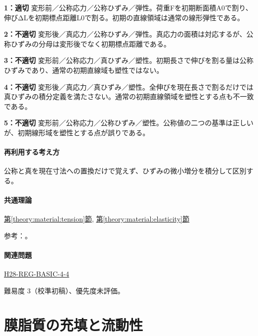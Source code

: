 \noindent\textbf{1：適切} 変形前／公称応力／公称ひずみ／弾性。荷重Fを初期断面積A0で割り、伸びΔLを初期標点距離L0で割る。初期の直線領域は通常の線形弾性である。\par

\noindent\textbf{2：不適切} 変形後／真応力／公称ひずみ／弾性。真応力の面積は対応するが、公称ひずみの分母は変形後でなく初期標点距離である。\par

\noindent\textbf{3：不適切} 変形前／公称応力／真ひずみ／塑性。初期長さで伸びを割る量は公称ひずみであり、通常の初期直線域も塑性ではない。\par

\noindent\textbf{4：不適切} 変形後／真応力／真ひずみ／塑性。全伸びを現在長さで割るだけでは真ひずみの積分定義を満たさない。通常の初期直線領域を塑性とする点も不一致である。\par

\noindent\textbf{5：不適切} 変形前／公称応力／公称ひずみ／塑性。公称値の二つの基準は正しいが、初期線形域を塑性とする点が誤りである。\par

\paragraph{再利用する考え方} 公称と真を現在寸法への置換だけで覚えず、ひずみの微小増分を積分して区別する。

\paragraph{共通理論} \hyperref[theory:material:tension]{第\ref*{theory:material:tension}節}, \hyperref[theory:material:elasticity]{第\ref*{theory:material:elasticity}節}

\par 参考：\cite{mit_material_stressstrain2001,mit_material_elastic2000}。

\paragraph{関連問題} \hyperref[q:h28-reg-basic-4-4]{H28-REG-BASIC-4-4}

\par 難易度 3（校準初稿）、優先度未評価。

\section{膜脂質の充填と流動性}

